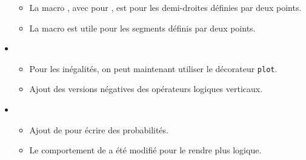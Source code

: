 \begin{itemize}[itemsep=.5em]
\begin{itemize}[itemsep=.5em]
        \item La macro , avec  pour , est pour les demi-droites définies par deux points.

        \item La macro  est utile pour les segments définis par deux points.
    \end{itemize}




    \item {}
    \begin{itemize}[itemsep=.5em]
        \item Pour les inégalités, on peut maintenant utiliser le décorateur \verb+plot+.

		\item Ajout des versions négatives des opérateurs logiques verticaux.
    \end{itemize}




    \item {}
    \begin{itemize}[itemsep=.5em]
        \item Ajout de  pour écrire des probabilités.

		\item Le comportement de  a été modifié pour le rendre plus logique.
    \end{itemize}
\end{itemize}
